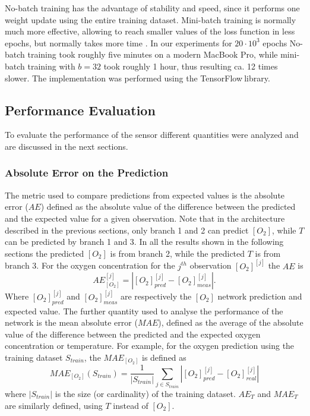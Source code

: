 \documentclass[9pt,twocolumn,twoside,pdftex]{optica}
\begin{document}
No-batch training has the advantage of stability and speed, since it performs one weight update using the entire training dataset. Mini-batch training is normally much more effective, allowing to reach smaller values of the loss function in less epochs, but normally takes more time \cite{Michelucci2017}. In our experiments for $20 \cdot 10^3$ epochs No-batch training took roughly five minutes on a modern MacBook Pro, while mini-batch training with $b=32$ took roughly 1 hour, thus resulting ca. 12 times slower. 
The implementation was performed using the TensorFlow\texttrademark $\ $library. 


\subsection{Performance Evaluation}

To evaluate the performance of the sensor different quantities were analyzed and are discussed in the next sections.


\subsubsection{Absolute Error on the Prediction}

The metric used to compare predictions from expected values is the absolute error ($AE$) defined as the absolute value of the difference between the predicted and the expected value for a given observation. Note that in the architecture described in the previous sections, only branch 1 and 2 can predict $[O_2]$, while $T$ can be predicted by branch 1 and 3. In all the results shown in the following sections the predicted $[O_2]$ is from branch 2, while the predicted $T$ is from branch 3. For the oxygen concentration for the 
$j^{th}$ observation $[O_2]^{[j]}$  the $AE$ is 
\begin{equation}
\label{AE}
AE^{{[j]}}_{[O_2]} = |[O_2]^{{[j]}}_{pred}-[O_2]^{[j]}_{meas}|.
\end{equation}
Where $[O_2]^{{[j]}}_{pred}$ and $[O_2]^{{[j]}}_{meas}$ are respectively the $[O_2]$ network prediction and  expected value.
The further quantity used to analyse the performance of the network is the mean absolute error ($MAE$), defined as the average of the absolute value of the difference between the predicted and the expected oxygen concentration or temperature. For example, for the oxygen prediction using the training dataset $S_{train}$, the $MAE_{[O_2]}$ is defined as 
\begin{equation}
\label{MAE}
MAE_{[O_2]}(S_{train}) = \frac{1}{|S_{train}|} \sum_{j \in S_{train}}|[O_2]_{pred}^{[j]}-[O_2]_{real}^{[j]}|
\end{equation}
where $|S_{train}|$ is the size (or cardinality) of the training dataset. 
$AE_{T}$ and $MAE_T$ are similarly defined, using $T$ instead of $[O_2]$.
\end{document}
